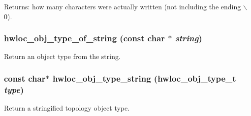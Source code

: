 \begin{Desc}
\item[Returns:]how many characters were actually written (not including the ending $\backslash$0). \end{Desc}
\hypertarget{group__hwlocality__conversion_g8a1eee67a1de115d264719157c109a20}{
\subsubsection[{hwloc\_\-obj\_\-type\_\-of\_\-string}]{ hwloc\_\-obj\_\-type\_\-of\_\-string (const char $\ast$ {\em string})}}
\label{group__hwlocality__conversion_g8a1eee67a1de115d264719157c109a20}


Return an object type from the string. 

\hypertarget{group__hwlocality__conversion_g5ca0bf94bbbb080d0eff17a57bd90422}{
\subsubsection[{hwloc\_\-obj\_\-type\_\-string}]{\setlength{\rightskip}{0pt plus 5cm}const char$\ast$ hwloc\_\-obj\_\-type\_\-string ({\bf hwloc\_\-obj\_\-type\_\-t} {\em type})}}
\label{group__hwlocality__conversion_g5ca0bf94bbbb080d0eff17a57bd90422}


Return a stringified topology object type. 

